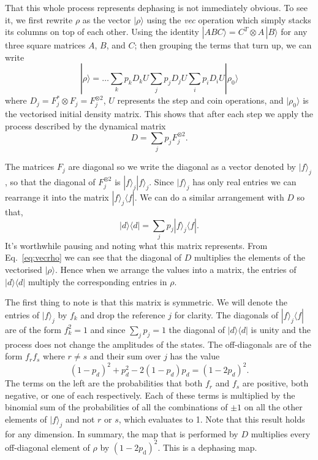 \documentclass[aps,pra,twocolumn,amsmath,amssymb,nofootinbib,superscriptaddress]{revtex4}
\newcommand{\bra}[1]{\langle#1|}
\newcommand{\ket}[1]{|#1\rangle}
\begin{document}
That this whole process represents dephasing is not immediately obvious. To see it, we first rewrite $\rho$ as the vector $\ket{\rho}$ using the \emph{vec} operation which simply stacks its columns on top of each other. Using the identity $\ket{ABC}=C^T\!\!\otimes\!A\,\ket{B}$ for any three square matrices $A$, $B$, and $C$; then grouping the terms that turn up, we can write 
\begin{equation} \label{eq:vecrho}
    \ket{\rho} = \ldots \sum_k p_k D_k U\sum_j p_j D_j U\sum_i p_i D_i U\ket{\rho_0}
\end{equation}
where $D_j = F_j^*\!\otimes\!F_j=F_j^{\otimes 2}$, $U$ represents the step and coin operations, and $\ket{\rho_0}$ is the vectorised initial density matrix. This shows that after each step we apply the process described by the dynamical matrix
\begin{equation}
    D = \sum_j p_j F_j^{\otimes 2}.
\end{equation}

The matrices $F_j$ are diagonal so we write the diagonal as a vector denoted by $\ket{f}_j$, so that the diagonal of $F_j^{\otimes 2}$ is $\ket{f}_j\ket{f}_j$. Since $\ket{f}_j$ has only real entries we can rearrange it into the matrix $\ket{f}_j\bra{f}$. We can do a similar arrangement with $D$ so that,
\begin{equation}
    \ket{d}\!\bra{d} =  \sum_j p_j \ket{f}_j\bra{f}.
\end{equation}
It's worthwhile pausing and noting what this matrix represents. From Eq.~\ref{eq:vecrho} we can see that the diagonal of $D$ multiplies the elements of the vectorised $\ket{\rho}$. Hence when we arrange the values into a matrix, the entries of $\ket{d}\!\bra{d}$ multiply the corresponding entries in $\rho$.

The first thing to note is that this matrix is symmetric. We will denote the entries of $\ket{f}_j$ by $f_k$ and drop the reference $j$ for clarity. The diagonals of $\ket{f}_j\bra{f}$ are of the form $f_k^2=1$ and since $\sum_j p_j = 1$ the diagonal of $\ket{d}\bra{d}$ is unity and the process does not change the amplitudes of the states. The off-diagonals are of the form $f_rf_s$ where $r\ne s$ and their sum over $j$ has the value
\begin{equation}
    (1-p_d)^2+p_d^2-2(1-p_d)p_d = (1-2p_d)^2.
\end{equation}
The terms on the left are the probabilities that both $f_r$ and $f_s$ are positive, both negative, or one of each respectively.
Each of these terms is multiplied by the binomial sum of the probabilities of all the combinations of $\pm 1$ on all the other elements of $\ket{f}_j$ and not $r$ or $s$, which evaluates to 1. Note that this result holds for any dimension. In summary, the map that is performed by $D$ multiplies every off-diagonal element of $\rho$ by $(1-2p_{\mathrm{d}})^2$. This is a dephasing map.
\end{document}
